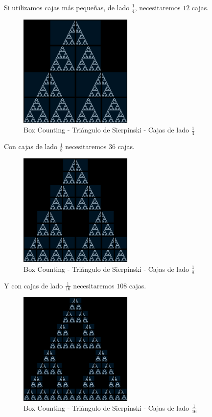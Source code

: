 \noindent Si utilizamos cajas más pequeñas, de lado $\frac{1}{4}$, necesitaremos $12$ cajas.

\begin{figure}[H]
    \centering
    \includegraphics[width=0.5\textwidth]{figures/boxcounting-sierspinsky-2.png}
    \caption{Box Counting - Triángulo de Sierpinski - Cajas de lado $\frac{1}{4}$}
\end{figure}

\noindent Con cajas de lado $\frac{1}{8}$ necesitaremos $36$ cajas.

\begin{figure}[H]
    \centering
    \includegraphics[width=0.5\textwidth]{figures/boxcounting-sierspinsky-3.png}
    \caption{Box Counting - Triángulo de Sierpinski - Cajas de lado $\frac{1}{8}$}
\end{figure}

\noindent Y con cajas de lado $\frac{1}{16}$ necesitaremos $108$ cajas.

\begin{figure}[H]
    \centering
    \includegraphics[width=0.5\textwidth]{figures/boxcounting-sierspinsky-4.png}
    \caption{Box Counting - Triángulo de Sierpinski - Cajas de lado $\frac{1}{16}$}
\end{figure}

